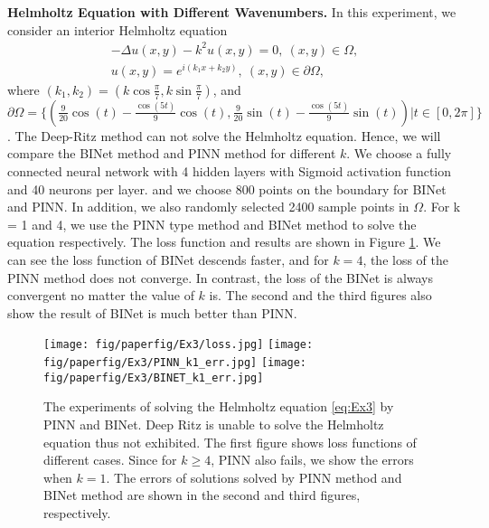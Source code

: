 \documentclass[hyperref]{article}
\numberwithin{equation}{section}
\theoremstyle{nonumberplain}
\begin{document}
	
	
	\noindent \textbf{Helmholtz Equation with Different Wavenumbers.}
	In this experiment, we consider an interior Helmholtz equation
	\begin{equation}
		\begin{aligned}
			-\Delta u(x,y) - k^2u(x,y) = 0,\ (x,y)\in\Omega,\\
			u(x,y) = e^{i(k_1x+k_2y)}, \ (x,y)\in\partial\Omega,
		\end{aligned}
		\label{eq:Ex3}
	\end{equation}
	where $(k_1,k_2)=(k\cos \frac{\pi}{7},k\sin\frac{\pi}{7})$, and $\partial\Omega=\{(\frac{9}{20}\cos(t)-\frac{\cos(5t)}{9}\cos(t),\frac{9}{20}\sin(t)-\frac{\cos(5t)}{9}\sin(t))|t\in[0,2\pi]\}$. The Deep-Ritz method can not solve the Helmholtz equation. Hence, we will compare the BINet method and PINN method for different $k$. We choose a fully connected neural network with 4 hidden layers with Sigmoid activation function and 40 neurons per layer.  and we choose 800 points on the boundary for BINet and PINN. In addition, we also randomly selected 2400 sample points in $\Omega$. For k = 1 and 4, we use the PINN type method and BINet method to solve the equation respectively. The loss function and results are shown in Figure \ref{f:Ex3}. We can see the loss function of BINet descends faster, and for $k=4$, the loss of the PINN method does not converge. In contrast, the loss of the BINet is always convergent no matter the value of $k$ is. The second and the third figures also show the result of BINet is much better than PINN. 
	\begin{figure}[t]
		\centering
		\texttt{[image: fig/paperfig/Ex3/loss.jpg]}
		\texttt{[image: fig/paperfig/Ex3/PINN\_k1\_err.jpg]}
		\texttt{[image: fig/paperfig/Ex3/BINET\_k1\_err.jpg]}
		\caption{The experiments of solving the Helmholtz equation \eqref{eq:Ex3} by PINN and BINet. Deep Ritz is unable to solve the Helmholtz equation thus not exhibited. The first figure shows loss functions of different cases. Since for $k\geq 4$, PINN also fails, we show the errors when $k=1$. The errors of solutions solved by PINN method and BINet method are shown in the second and third figures, respectively.}
		\label{f:Ex3}
	\end{figure}
	
	
	
\end{document}
